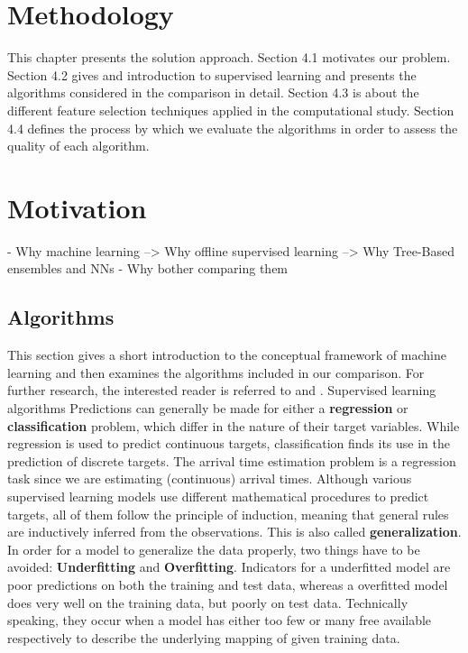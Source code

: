 \chapter{Methodology}
This chapter presents the solution approach.
Section 4.1 motivates our problem. 
Section 4.2 gives and introduction to supervised learning and presents the algorithms considered in the comparison in detail.
Section 4.3 is about the different feature selection techniques applied in the computational study. 
Section 4.4 defines the process by which we evaluate the algorithms in order to assess the quality of each algorithm.

\chapter{Motivation}

- Why machine learning --> Why offline supervised learning --> Why Tree-Based ensembles and NNs
- Why bother comparing them


\section{Algorithms}
This section gives a short introduction to the conceptual framework of machine learning and then examines the algorithms included in our comparison. For further research, the interested reader is referred to \cite{Bishop} and \cite{SLFoundations}.
\newline
\newline
Supervised learning algorithms 
\newline
\newline
Predictions can generally be made for either a \textbf{regression} or \textbf{classification} problem, which differ in the nature of their target variables. While regression is used to predict continuous targets, classification finds its use in the prediction of discrete targets. The arrival time estimation problem is a regression task since we are estimating (continuous) arrival times.
Although various supervised learning models use different mathematical procedures to predict targets, all of them follow the principle of induction, meaning that general rules are inductively inferred from the observations. This is also called \textbf{generalization}.  
In order for a model to generalize the data properly, two things have to be avoided: \textbf{Underfitting} and \textbf{Overfitting}. Indicators for a underfitted model are poor predictions on both the training and test data, whereas a overfitted model does very well on the training data, but poorly on test data. Technically speaking, they occur when a model has either too few or many free available respectively to describe the underlying mapping of given training data.  

